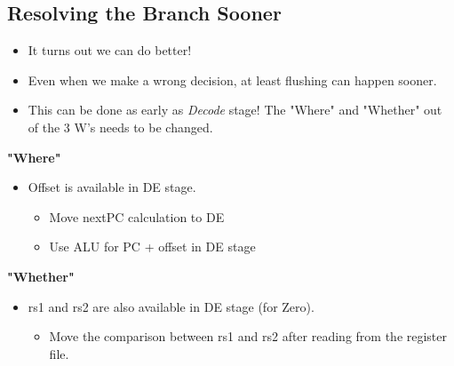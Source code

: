 \documentclass[10pt]{article}
\begin{document}
\subsection*{Resolving the Branch Sooner}
\begin{itemize}
    \item It turns out we can do better!
    \item Even when we make a wrong decision, at least flushing can happen sooner.
    \item This can be done as early as \textit{Decode} stage!  The "Where" and "Whether" out of the 3 W's needs to be changed.
\end{itemize}
\textbf{"Where"}
\begin{itemize}
    \item Offset is available in DE stage.
    \begin{itemize}
        \item Move nextPC calculation to DE
        \item Use ALU for PC + offset in DE stage
    \end{itemize}
\end{itemize}
\textbf{"Whether"}
\begin{itemize}
    \item rs1 and rs2 are also available in DE stage (for Zero).
    \begin{itemize}
        \item Move the comparison between rs1 and rs2 after reading from the register file.
    \end{itemize}
\end{itemize}
\end{document}
